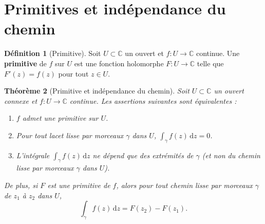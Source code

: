 \documentclass[12pt,a4paper,openany]{book}
\theoremstyle{definition}
\newtheorem{definition}{Définition}[chapter]
\theoremstyle{plain}
\newtheorem{theoreme}[definition]{Théorème}
\theoremstyle{remark}
\newcommand{\C}{\mathbb{C}}
\newcommand{\dd}{\mathrm{d}}
\begin{document}
\section{Primitives et indépendance du chemin}\label{sec:primitives}

\begin{definition}[Primitive]\label{def:primitive}
Soit $U \subset \C$ un ouvert et $f \colon U \to \C$ continue. Une
\textbf{primitive} de $f$ sur $U$ est une fonction holomorphe
$F \colon U \to \C$ telle que $F'(z) = f(z)$ pour tout $z \in U$.
\end{definition}

\begin{theoreme}[Primitive et indépendance du chemin]\label{thm:primitive-indep}
Soit $U \subset \C$ un ouvert connexe et $f \colon U \to \C$ continue.
Les assertions suivantes sont équivalentes :
\begin{enumerate}[label=\textup{(\roman*)}]
  \item $f$ admet une primitive sur $U$.
  \item Pour tout lacet lisse par morceaux $\gamma$ dans $U$,
    $\displaystyle \int_\gamma f(z)\,\dd z = 0$.
  \item L'intégrale $\int_\gamma f(z)\,\dd z$ ne dépend que des extrémités
    de $\gamma$ (et non du chemin lisse par morceaux $\gamma$ dans $U$).
\end{enumerate}
De plus, si $F$ est une primitive de $f$, alors pour tout chemin lisse par
morceaux $\gamma$ de $z_1$ à $z_2$ dans $U$,
\[
  \int_\gamma f(z)\,\dd z = F(z_2) - F(z_1).
\]
\end{theoreme}
\end{document}
